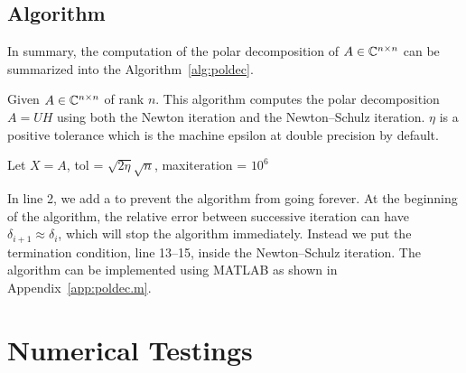 \documentclass[12pt]{article}
\begin{document}
\subsection{Algorithm}
In summary, the computation of the polar decomposition of $A\in\mathbb{C}^{n\times n}$ can be summarized into the Algorithm~\ref{alg:poldec}.

\begin{algorithm}[hbt!]
    \caption{Given $A\in\mathbb{C}^{n\times n}$ of rank $n$. This algorithm computes the polar decomposition $A = UH$ using both the Newton iteration and the Newton--Schulz iteration. $\eta$ is a positive tolerance which is the machine epsilon at double precision by default.}
    \label{alg:poldec}
    \begin{algorithmic}[1]
        \State Let $X = A$, 
        \State tol = $\sqrt{2\eta}\sqrt{n}$, maxiteration = $10^6$
            \EndIf
                \EndIf
            \Else 
            \EndIf
        \EndFor
    \end{algorithmic}
\end{algorithm}

In line 2, we add a  to prevent the algorithm from going forever.
At the beginning of the algorithm, the relative error between successive iteration can have $\delta_{i+1} \approx \delta_i$, which will stop the algorithm immediately. Instead we put the termination condition, line 13--15, inside the Newton--Schulz iteration.
The algorithm can be implemented  using MATLAB as shown in Appendix~\ref{app:poldec.m}.

\section{Numerical Testings}
\end{document}
